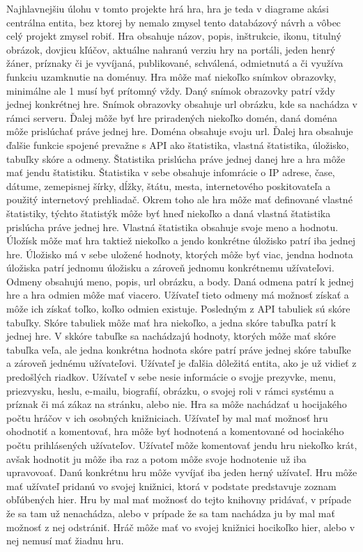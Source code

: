 Najhlavnejšiu úlohu v tomto projekte hrá hra, hra je teda v diagrame akási centrálna entita, bez ktorej by nemalo zmysel tento databázový návrh a vôbec celý projekt zmysel robiť. Hra obsahuje názov, popis, inštrukcie, ikonu, titulný obrázok, dovjicu kľúčov, aktuálne nahranú verziu hry na portáli, jeden henrý žáner, príznaky či je vyvíjaná, publikované, schválená, odmietnutá a či využíva funkciu uzamknutie na doménuy. Hra môže mať niekoľko snímkov obrazovky, minimálne ale 1 musí byť prítomný vždy. Daný snímok obrazovky patrí vždy jednej konkrétnej hre. Snímok obrazovky obsahuje url obrázku, kde sa nachádza v rámci serveru. Ďalej môže byť hre priradených niekoľko domén, daná doména môže prislúchať práve jednej hre. Doména obsahuje svoju url. Ďalej hra obsahuje ďalšie funkcie spojené prevažne s API ako štatistika, vlastná štatistika, úložisko, tabuľky skóre a odmeny. Štatistika prislúcha práve jednej danej hre a hra môže mať jendu štatistiku. Štatistika v sebe obsahuje infomrácie o IP adrese, čase, dátume, zemepisnej šírky, dĺžky, štátu, mesta, internetového poskitovateľa a použitý internetový prehliadač. Okrem toho ale hra môže mať definované vlastné štatistiky, týchto štatistýk môže byť hneď niekoľko a daná vlastná štatistika prislúcha práve jednej hre. Vlastná štatistika obsahuje svoje meno a hodnotu. Úložísk môže mať hra taktiež niekoľko a jendo konkrétne úložisko patrí iba jednej hre. Úložisko má v sebe uložené hodnoty, ktorých môže byť viac, jendna hodnota úložiska patrí jednomu úložisku a zároveň jednomu konkrétnemu užívateľovi. Odmeny obsahujú meno, popis, url obrázku, a body. Daná odmena patrí k jednej hre a hra odmien môže mať viacero. Užívateľ tieto odmeny má možnosť získať a môže ich získať toľko, koľko odmien existuje. Posledným z API tabuliek sú skóre tabuľky. Skóre tabuliek môže mať hra niekoľko, a jedna skóre tabuľka patrí k jednej hre. V skkóre tabuľke sa nachádzajú hodnoty, ktorých môže mať skóre tabuľka veľa, ale jedna konkrétna hodnota skóre patrí práve jednej skóre tabuľke a zároveň jednému užívateľovi. Užívateľ je ďalšia dôležitá entita, ako je už vidieť z predošlých riadkov. Užívateľ v sebe nesie informácie o svojje prezyvke, menu, priezvysku, heslu, e-mailu, biografií, obrázku, o svojej roli v rámci systému a príznak či má zákaz na stránku, alebo nie. Hra sa môže nachádzať u hocijakého počtu hráčov v ich osobných knižniciach. Užívateľ by mal mať možnosť hru ohodnotiť a komentovať, hra môže byť hodnotená a komentované od hociakého počtu prihlásených užívateľov. Užívateľ môže komentovať jendu hru niekoľko krát, avšak hodnotit ju môže iba raz a potom môže svoje hodnotenie už iba upravovoať. Danú konkrétnu hru môže vyvíjať iba jeden herný užívateľ. Hru môže mať užívateľ pridanú vo svojej knižnici, ktorá v podstate predstavuje zoznam obľúbených hier. Hru by mal mať možnosť do tejto knihovny pridávať, v prípade  že sa tam už nenachádza, alebo v prípade že sa tam nachádza ju by mal mať možnosť z nej odstrániť. Hráč môže mať vo svojej knižnici hocikoľko hier, alebo v nej nemusí mať žiadnu hru.
